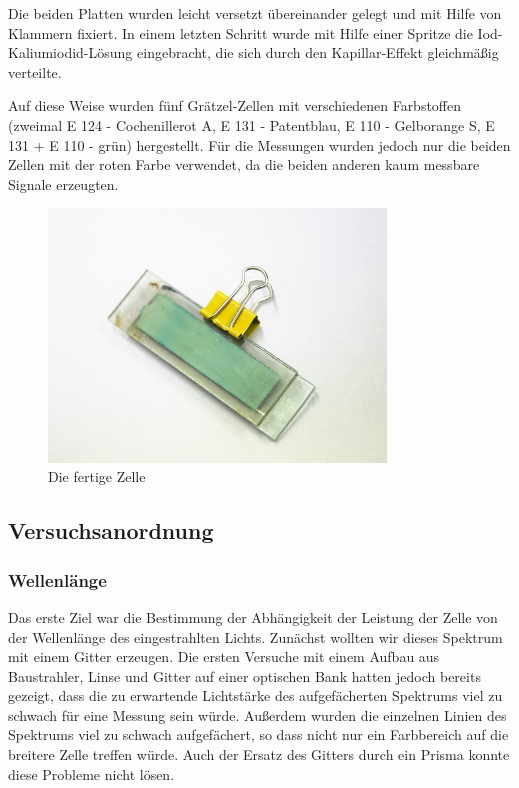 \documentclass[11pt]{scrartcl}
\begin{document}
Die beiden Platten wurden leicht versetzt übereinander gelegt und mit Hilfe von Klammern fixiert. In einem letzten Schritt wurde mit Hilfe einer Spritze die Iod-Kaliumiodid-Lösung eingebracht, die sich durch den Kapillar-Effekt gleichmäßig verteilte.

Auf diese Weise wurden fünf Grätzel-Zellen mit verschiedenen Farbstoffen (zweimal E 124 - Cochenillerot A, E 131 - Patentblau, E 110 - Gelborange S, E 131 + E 110 - grün) hergestellt. Für die Messungen wurden jedoch nur die beiden Zellen mit der roten Farbe verwendet, da die beiden anderen kaum messbare Signale erzeugten. %

\begin{figure}[ht]
\begin{center}
\includegraphics[width=0.8\textwidth]{images/zelle_gruen.jpg}
\end{center}
\vspace{-1.5\baselineskip}
\caption{Die fertige Zelle}
\label{zelle_gruen.jpg}
\end{figure}



\subsection{Versuchsanordnung} %
\subsubsection{Wellenlänge}
Das erste Ziel war die Bestimmung der Abh\"angigkeit der Leistung der Zelle von der Wellenl\"ange des eingestrahlten Lichts. Zun\"achst wollten wir dieses Spektrum mit einem Gitter erzeugen. Die ersten Versuche mit einem Aufbau aus Baustrahler, Linse und Gitter auf einer optischen Bank hatten jedoch bereits gezeigt, dass die zu erwartende Lichtst\"arke des aufgef\"acherten Spektrums viel zu schwach f\"ur eine Messung sein w\"urde. Außerdem wurden die einzelnen Linien des Spektrums viel zu schwach aufgef\"achert, so dass nicht nur ein Farbbereich auf die breitere Zelle treffen w\"urde. Auch der Ersatz des Gitters durch ein Prisma konnte diese Probleme nicht l\"osen.
\end{document}
